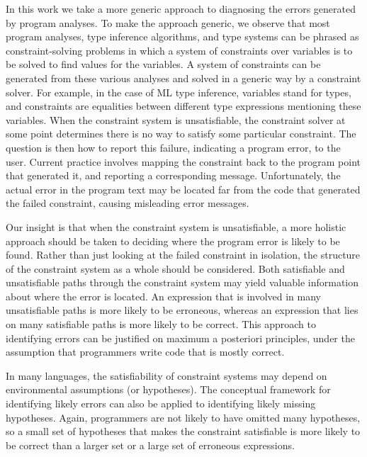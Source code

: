 In this work we take a more generic approach to diagnosing the errors
generated by program analyses.  To make the approach generic, we
observe that most program analyses, type inference algorithms, and
type systems can be phrased as constraint-solving problems in which a
system of constraints over variables is to be solved to find values
for the variables.  A system of constraints can be generated from
these various analyses and solved in a generic way by a constraint
solver. For example, in the case of ML type inference, variables
stand for types, and constraints are equalities between different
type expressions mentioning these variables. When the constraint
system is unsatisfiable, the constraint solver at some point
determines there is no way to satisfy some particular constraint. The
question is then how to report this failure, indicating a program
error, to the user. Current practice involves mapping the constraint
back to the program point that generated it, and reporting a
corresponding message. Unfortunately, the actual error in the program
text may be located far from the code that generated the failed
constraint, causing misleading error messages.

Our insight is that when the constraint system is unsatisfiable, a
more holistic approach should be taken to deciding where the program
error is likely to be found. Rather than just looking at the failed
constraint in isolation, the structure of the constraint system as
a whole should be considered. Both satisfiable and unsatisfiable
paths through the constraint system may yield valuable information
about where the error is located.  An expression that is involved
in many unsatisfiable paths is more likely to be erroneous, whereas
an expression that lies on many satisfiable paths is more likely to
be correct. This approach to identifying errors can be
justified on maximum a posteriori principles, under the assumption
that programmers write code that is mostly correct.

In many languages, the satisfiability of constraint systems may depend
on environmental assumptions (or hypotheses). The conceptual framework
for identifying likely errors can also be applied to identifying likely
missing hypotheses. Again, programmers are not likely to have omitted
many hypotheses, so a small set of hypotheses that makes the constraint
satisfiable is more likely to be correct than a larger set or a large
set of erroneous expressions.

